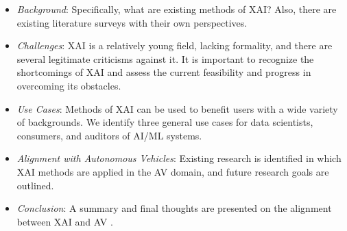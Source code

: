 \begin{itemize}
    \item\textit{Background}: Specifically, what are existing methods of XAI?  Also, there are existing literature surveys with their own perspectives.

    \item\textit{Challenges}: XAI is a relatively young field, lacking formality, and there are several legitimate criticisms against it.  It is important to recognize the shortcomings of XAI and assess the current feasibility and progress in overcoming its obstacles.

    \item\textit{Use Cases}: Methods of XAI can be used to benefit users with a wide variety of backgrounds.  We identify three general use cases for data scientists, consumers, and auditors of AI/ML systems.

    \item\textit{Alignment with Autonomous Vehicles}: Existing research is identified in which XAI methods are applied in the AV domain, and future research goals are outlined.

    \item\textit{Conclusion}: A summary and final thoughts are presented on the alignment between XAI and AV .
\end{itemize}
